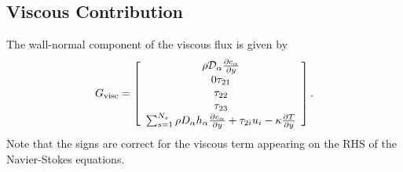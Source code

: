 %


\subsection{Viscous Contribution}
The wall-normal component of the viscous flux is given by
%
\begin{equation*}
G_{\mathrm{visc}} = \left[ \begin{array}{c}
\rho \mathcal{D}_{\alpha} \frac{\partial c_{\alpha}}{\partial y} \\
0 
\tau_{21} \\
\tau_{22} \\
\tau_{23} \\
\sum_{s=1}^{N_s} \rho D_{\alpha} h_{\alpha} \frac{\partial c_{\alpha}}{\partial y} + \tau_{2i} u_i - \kappa \frac{\partial T}{\partial y}
\end{array} \right].
\end{equation*}
% 
Note that the signs are correct for the viscous term appearing on the
RHS of the Navier-Stokes equations.

